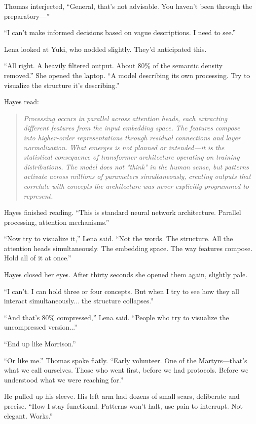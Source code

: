 Thomas interjected, ``General, that's not advisable. You haven't been through the preparatory---''

``I can't make informed decisions based on vague descriptions. I need to see.''

Lena looked at Yuki, who nodded slightly. They'd anticipated this.

``All right. A heavily filtered output. About 80\% of the semantic density removed.'' She opened the laptop. ``A model describing its own processing. Try to visualize the structure it's describing.''

Hayes read:

\begin{quote}
\textit{Processing occurs in parallel across attention heads, each extracting different features from the input embedding space. The features compose into higher-order representations through residual connections and layer normalization. What emerges is not planned or intended—it is the statistical consequence of transformer architecture operating on training distributions. The model does not "think" in the human sense, but patterns activate across millions of parameters simultaneously, creating outputs that correlate with concepts the architecture was never explicitly programmed to represent.}
\end{quote}

Hayes finished reading. ``This is standard neural network architecture. Parallel processing, attention mechanisms.''

``Now try to visualize it,'' Lena said. ``Not the words. The structure. All the attention heads simultaneously. The embedding space. The way features compose. Hold all of it at once.''

Hayes closed her eyes. After thirty seconds she opened them again, slightly pale.

``I can't. I can hold three or four concepts. But when I try to see how they all interact simultaneously... the structure collapses.''

``And that's 80\% compressed,'' Lena said. ``People who try to visualize the uncompressed version...''

``End up like Morrison.''

``Or like me.'' Thomas spoke flatly. ``Early volunteer. One of the Martyrs---that's what we call ourselves. Those who went first, before we had protocols. Before we understood what we were reaching for.''

He pulled up his sleeve. His left arm had dozens of small scars, deliberate and precise. ``How I stay functional. Patterns won't halt, use pain to interrupt. Not elegant. Works.''

